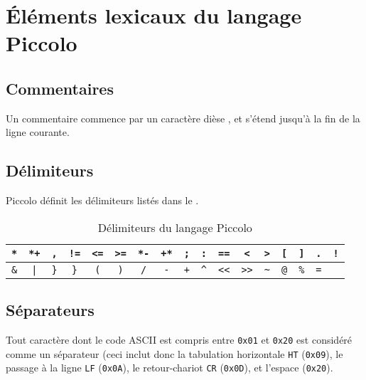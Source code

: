 
\cleardoublepage

\chapter{Éléments lexicaux du langage Piccolo}

\thispagestyle{empty}


\section{Commentaires}

Un commentaire commence par un caractère dièse \piccolo{\#}, et s’étend jusqu’à la fin de la ligne courante.

\section{Délimiteurs}

Piccolo définit les délimiteurs listés dans le .

\begin{table}[ht]
  \centering
  \begin{tabular}{|c|c|c|c|c|c|c|c|c|c|c|c|c|c|c|c|c|}
    \hline
    \texttt{*}  & \texttt{*+} & \texttt{,}  & \texttt{!=} & \texttt{<=} & \texttt{>=} & \texttt{*-} & \texttt{+*} & \texttt{;} & \texttt{:} & \texttt{==} & \texttt{<} & \texttt{>} & \texttt{[} & \texttt{]} & \texttt{.} & \texttt{!} \\
    \hline
    \texttt{\&} & \texttt{|}  & \texttt{\}} & \texttt{\}} & \texttt{(}  & \texttt{)}  & \texttt{/}  & \texttt{-} & \texttt{+} & \texttt{\textasciicircum} & \texttt{<{}<} & \texttt{>{}>} & \texttt{\textasciitilde} & \texttt{@} & \texttt{\%} & \texttt{=} & \\
    \hline
  \end{tabular}
  \caption{Délimiteurs du langage Piccolo}
\end{table}

\section{Séparateurs}

Tout caractère dont le code ASCII est compris entre \texttt{0x01} et \texttt{0x20} est considéré comme un séparateur (ceci inclut donc la tabulation horizontale \texttt{HT} (\texttt{0x09}), le passage à la ligne \texttt{LF} (\texttt{0x0A}), le retour-chariot \texttt{CR} (\texttt{0x0D}), et l’espace (\texttt{0x20}).


